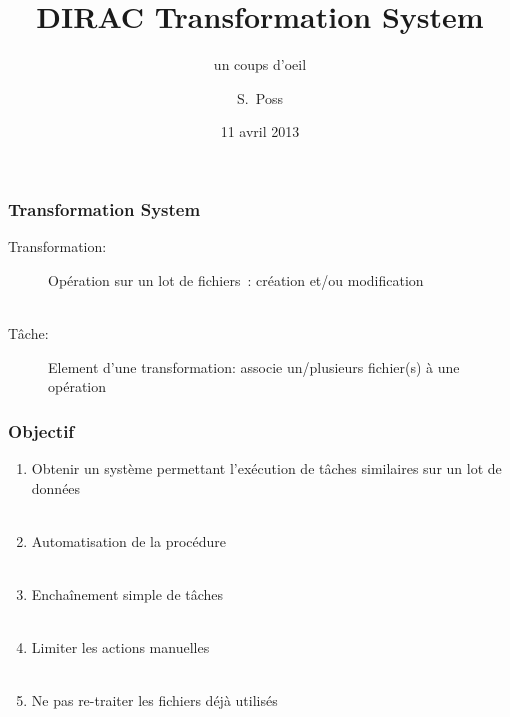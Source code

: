 \documentclass[10pt,table,dvipsnames]{beamer}
\author{S.~Poss}
\title{DIRAC Transformation System}
\subtitle{un coups d'oeil}
\date{11 avril 2013}
\institute{CERN, LAPP}
\begin{document}
\renewcommand{\inserttotalframenumber}{\ref{lastframe}}

\begin{frame}
\titlepage
\end{frame}


\begin{frame}
  \frametitle{Transformation System}

  \begin{description}
    \item[Transformation:] Op\'eration sur un lot de fichiers~: cr\'eation et/ou modification \\
~\\
    \item[T\^ache:] Element d'une transformation: associe un/plusieurs fichier(s) \`a
      une op\'eration
  \end{description}
\end{frame}

\begin{frame}
  \frametitle{Objectif}
\begin{enumerate}
\item Obtenir un syst\`eme permettant l'ex\'ecution de t\^aches similaires sur un
lot de donn\'ees\\~\\
\item Automatisation de la proc\'edure\\~\\
\item Encha\^inement simple de t\^aches\\~\\
\item Limiter les actions manuelles\\~\\
\item Ne pas re-traiter les fichiers d\'ej\`a utilis\'es
\end{enumerate}
\end{frame}
\end{document}
